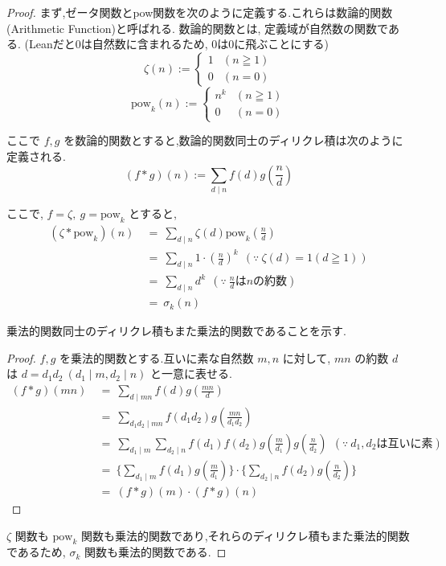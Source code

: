 \begin{proof}
まず,ゼータ関数とpow関数を次のように定義する.これらは数論的関数(Arithmetic Function)と呼ばれる.
数論的関数とは, 定義域が自然数の関数である. (Leanだと0は自然数に含まれるため, 0は0に飛ぶことにする)
\[
\zeta(n) :=
\begin{cases}
  1 & (n \geqq 1)\\
  0 & (n = 0)
\end{cases}
\]
\[
\mathrm{pow}_k(n) :=
\begin{cases}
  n^k & (n \geqq 1)\\
  0 & (n = 0)
\end{cases}
\]

ここで \(f, g\) を数論的関数とすると,数論的関数同士のディリクレ積は次のように定義される.
\[
  (f \ast g)(n) := \sum_{d \mid n} f(d)g(\frac{n}{d})
\]

ここで, \(f = \zeta, ~g = \mathrm{pow}_k\) とすると,
\begin{align*}
  (\zeta \ast \mathrm{pow}_k)(n) ~&=~ \sum_{d \mid n} \zeta(d) \mathrm{pow}_k(\frac{n}{d})\\
                                 ~&=~ \sum_{d \mid n} 1 \cdot (\frac{n}{d})^k~~(\because~\zeta(d) = 1 (d \geqq 1))\\
                                 ~&=~ \sum_{d \mid n} d ^ k~~(\because ~\frac{n}{d} \text{は} n \text{の約数})\\
                                 ~&=~ \sigma_k(n)
\end{align*}

乗法的関数同士のディリクレ積もまた乗法的関数であることを示す.
\begin{proof}
\(f, g\) を乗法的関数とする.互いに素な自然数 \(m, n\) に対して,
\(mn\) の約数 \(d\) は \(d = d_1d_2 ~(d_1 \mid m, d_2 \mid n)\) と一意に表せる.
\begin{align*}
  (f \ast g)(mn) ~&=~ \sum_{d \mid mn} f(d)g(\frac{mn}{d})\\
                 ~&=~ \sum_{d_1d_2 \mid mn} f(d_1d_2)g(\frac{mn}{d_1d_2})\\
                 ~&=~ \sum_{d_1 \mid m} \sum_{d_2 \mid n} f(d_1)f(d_2)g(\frac{m}{d_1})g(\frac{n}{d_2})~~(\because ~d_1, d_2 \text{は互いに素})\\
                 ~&=~ \{\sum_{d_1 \mid m} f(d_1)g(\frac{m}{d_1})\} \cdot \{\sum_{d_2 \mid n} f(d_2)g(\frac{n}{d_2})\}\\
                 ~&=~ (f \ast g)(m) \cdot (f \ast g)(n)
\end{align*}\end{proof}
\(\zeta\) 関数も \(\mathrm{pow}_k\) 関数も乗法的関数であり,それらのディリクレ積もまた乗法的関数であるため,
\(\sigma_k\) 関数も乗法的関数である.
\end{proof}


